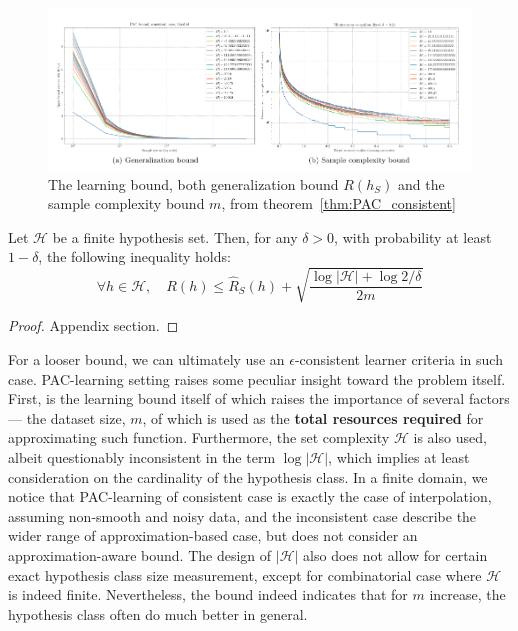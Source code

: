 \documentclass[10pt]{article} %
\begin{document}
\begin{figure}[htb]
    \centering
    \includegraphics[width=\textwidth]{pdf/PAC_consistent.pdf}
    \caption{The learning bound, both generalization bound $R(h_{S})$ and the sample complexity bound $m$, from theorem~\ref{thm:PAC_consistent}}
\end{figure}

\begin{theorem}\label{thm:theorem_inconsistent}
    Let $\mathcal{H}$ be a finite hypothesis set. Then, for any $\delta > 0$, with probability at least $1-\delta$, the following inequality holds: 
    \begin{equation}
        \forall h \in \mathcal{H}, \quad R(h) \leq \hat{R}_S (h) + \sqrt{\frac{\log{|\mathcal{H}|}+ \log{2/\delta}}{2m}}
    \end{equation}
\end{theorem}
\begin{proof}
    Appendix section.
\end{proof}


For a looser bound, we can ultimately use an $\epsilon$-consistent learner criteria in such case. PAC-learning setting raises some peculiar insight toward the problem itself. First, is the learning bound itself of which raises the importance of several factors --- the dataset size, $m$, of which is used as the \textbf{total resources required} for approximating such function. Furthermore, the set complexity $\mathcal{H}$ is also used, albeit questionably inconsistent in the term $\log{|\mathcal{H}|}$, which implies at least consideration on the cardinality of the hypothesis class. In a finite domain, we notice that PAC-learning of consistent case is exactly the case of interpolation, assuming non-smooth and noisy data, and the inconsistent case describe the wider range of approximation-based case, but does not consider an approximation-aware bound. The design of $|\mathcal{H}|$ also does not allow for certain exact hypothesis class size measurement, except for combinatorial case where $\mathcal{H}$ is indeed finite. Nevertheless, the bound indeed indicates that for $m$ increase, the hypothesis class often do much better in general. 
\end{document}
